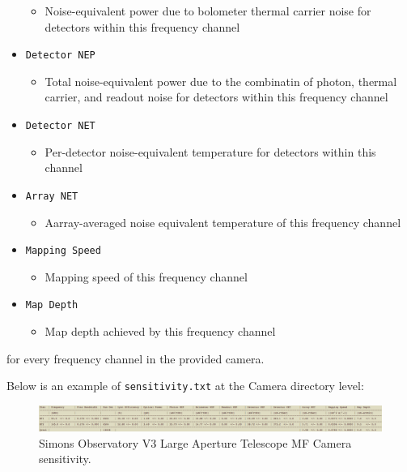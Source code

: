 \documentclass[11pt]{article} %
\begin{document}
\begin{itemize}[noitemsep,topsep=0pt]
		\begin{itemize}[noitemsep,topsep=0pt]
		\item Noise-equivalent power due to bolometer thermal carrier noise for detectors within this frequency channel
		\end{itemize}
	\item \texttt{Detector NEP}
		\begin{itemize}[noitemsep,topsep=0pt]
		\item Total noise-equivalent power due to the combinatin of photon, thermal carrier, and readout noise for detectors within this frequency channel
		\end{itemize}
	\item \texttt{Detector NET} 
		\begin{itemize}[noitemsep,topsep=0pt]
		\item Per-detector noise-equivalent temperature for detectors within this channel
		\end{itemize}
	\item \texttt{Array NET}
		\begin{itemize}[noitemsep,topsep=0pt]
		\item Aarray-averaged noise equivalent temperature of this frequency channel
		\end{itemize}
	\item \texttt{Mapping Speed}
		\begin{itemize}[noitemsep,topsep=0pt]	
		\item Mapping speed of this frequency channel
		\end{itemize}
	\item \texttt{Map Depth}
		\begin{itemize}[noitemsep,topsep=0pt]
		\item Map depth achieved by this frequency channel
		\end{itemize}
\end{itemize}
for every frequency channel in the provided camera.

Below is an example of \texttt{sensitivity.txt} at the Camera directory level:

\begin{figure}[h!]
	\centering
	\includegraphics[width=1.0\textwidth]{Camera_sensEx}
	\caption{Simons Observatory V3 Large Aperture Telescope MF Camera sensitivity. \label{camSens}}
\end{figure}
\end{document}
